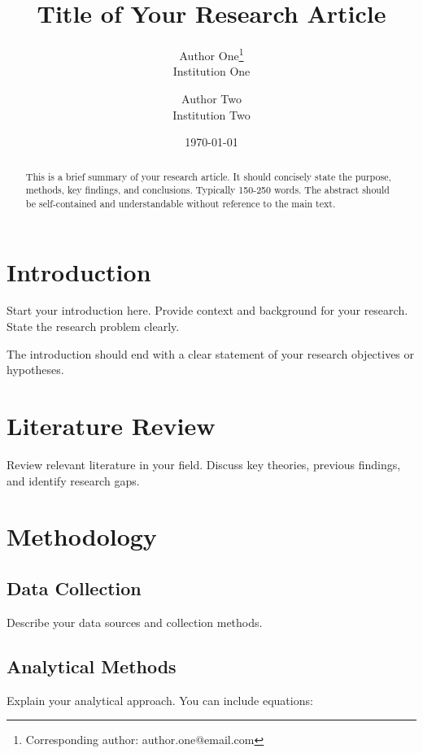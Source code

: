 \documentclass[11pt,a4paper]{article}
\title{Title of Your Research Article}
\author{
    Author One\thanks{Corresponding author: author.one@email.com} \\
    Institution One \\
    \and
    Author Two \\
    Institution Two
}
\date{\today}
\begin{document}
\maketitle

\begin{abstract}
This is a brief summary of your research article. It should concisely state the purpose, methods, key findings, and conclusions. Typically 150-250 words. The abstract should be self-contained and understandable without reference to the main text.
\end{abstract}


\section{Introduction}
\label{sec:introduction}

Start your introduction here. Provide context and background for your research. State the research problem clearly. 


The introduction should end with a clear statement of your research objectives or hypotheses.

\section{Literature Review}
\label{sec:literature}

Review relevant literature in your field. Discuss key theories, previous findings, and identify research gaps.

\section{Methodology}
\label{sec:methodology}

\subsection{Data Collection}
Describe your data sources and collection methods.

\subsection{Analytical Methods}
Explain your analytical approach. You can include equations:
\end{document}

